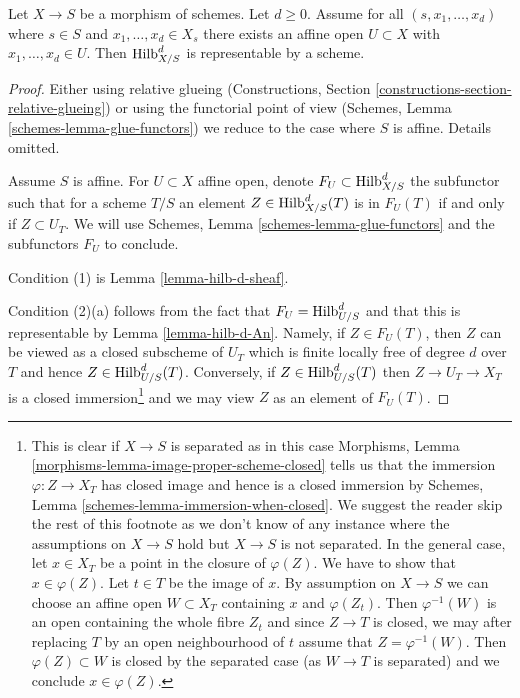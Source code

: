 \begin{proposition}
\label{proposition-hilb-d-representable}
Let $X \to S$ be a morphism of schemes. Let $d \geq 0$. Assume
for all $(s, x_1, \ldots, x_d)$ where $s \in S$ and
$x_1, \ldots, x_d \in X_s$ there exists an affine open $U \subset X$
with $x_1, \ldots, x_d \in U$. Then $\mathrm{Hilb}^d_{X/S}$ is
representable by a scheme.
\end{proposition}

\begin{proof}
Either using relative glueing (Constructions, Section
\ref{constructions-section-relative-glueing}) or using
the functorial point of view
(Schemes, Lemma \ref{schemes-lemma-glue-functors})
we reduce to the case where $S$ is affine. Details omitted.

\medskip\noindent
Assume $S$ is affine. For $U \subset X$ affine open, denote
$F_U \subset \mathrm{Hilb}^d_{X/S}$ the subfunctor such that
for a scheme $T/S$ an element $Z \in \mathrm{Hilb}^d_{X/S}(T)$
is in $F_U(T)$ if and only if $Z \subset U_T$. We will use
Schemes, Lemma \ref{schemes-lemma-glue-functors}
and the subfunctors $F_U$ to conclude.

\medskip\noindent
Condition (1) is Lemma \ref{lemma-hilb-d-sheaf}.

\medskip\noindent
Condition (2)(a) follows from the fact that $F_U = \mathrm{Hilb}^d_{U/S}$
and that this is representable by Lemma \ref{lemma-hilb-d-An}.
Namely, if $Z \in F_U(T)$, then $Z$ can be viewed as a closed subscheme
of $U_T$ which is finite locally free of degree $d$ over $T$ and hence
$Z \in \mathrm{Hilb}^d_{U/S}(T)$. Conversely, if $Z \in \mathrm{Hilb}^d_{U/S}(T)$
then $Z \to U_T \to X_T$ is a closed immersion\footnote{This is clear
if $X \to S$ is separated as in this case Morphisms, Lemma
\ref{morphisms-lemma-image-proper-scheme-closed}
tells us that the immersion $\varphi : Z \to X_T$ has closed image
and hence is a closed immersion by
Schemes, Lemma \ref{schemes-lemma-immersion-when-closed}. We suggest the
reader skip the rest of this footnote as we don't know of any instance
where the assumptions on $X \to S$ hold but $X \to S$ is not separated.
In the general case, let $x \in X_T$ be a point in the closure of
$\varphi(Z)$. We have to show that $x \in \varphi(Z)$. Let $t \in T$ be the
image of $x$. By assumption on $X \to S$ we can choose an affine open
$W \subset X_T$ containing $x$ and $\varphi(Z_t)$. Then $\varphi^{-1}(W)$
is an open containing the whole fibre $Z_t$ and since $Z \to T$ is closed,
we may after replacing $T$ by an open neighbourhood of $t$ assume that
$Z = \varphi^{-1}(W)$. Then $\varphi(Z) \subset W$ is closed by the
separated case (as $W \to T$ is separated) and we conclude $x \in \varphi(Z)$.}
and we may view $Z$ as an element of $F_U(T)$.


\end{proof}
